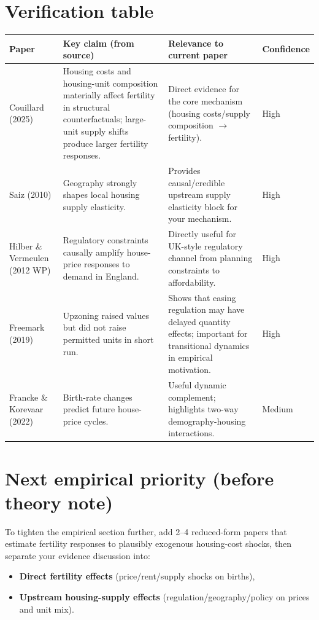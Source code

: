 \documentclass[11pt]{article}
\begin{document}
\section{Verification table}
\renewcommand{\arraystretch}{1.2}
\begin{tabular}{p{} p{} p{} p{}}
\toprule
Paper & Key claim (from source) & Relevance to current paper & Confidence \\
\midrule
Couillard (2025) & Housing costs and housing-unit composition materially affect fertility in structural counterfactuals; large-unit supply shifts produce larger fertility responses. & Direct evidence for the core mechanism (housing costs/supply composition $\rightarrow$ fertility). & High \\
Saiz (2010) & Geography strongly shapes local housing supply elasticity. & Provides causal/credible upstream supply elasticity block for your mechanism. & High \\
Hilber \& Vermeulen (2012 WP) & Regulatory constraints causally amplify house-price responses to demand in England. & Directly useful for UK-style regulatory channel from planning constraints to affordability. & High \\
Freemark (2019) & Upzoning raised values but did not raise permitted units in short run. & Shows that easing regulation may have delayed quantity effects; important for transitional dynamics in empirical motivation. & High \\
Francke \& Korevaar (2022) & Birth-rate changes predict future house-price cycles. & Useful dynamic complement; highlights two-way demography-housing interactions. & Medium \\
\bottomrule
\end{tabular}

\section{Next empirical priority (before theory note)}
To tighten the empirical section further, add 2--4 reduced-form papers that estimate fertility responses to plausibly exogenous housing-cost shocks, then separate your evidence discussion into:
\begin{itemize}
    \item \textbf{Direct fertility effects} (price/rent/supply shocks on births),
    \item \textbf{Upstream housing-supply effects} (regulation/geography/policy on prices and unit mix).
\end{itemize}
\end{document}
